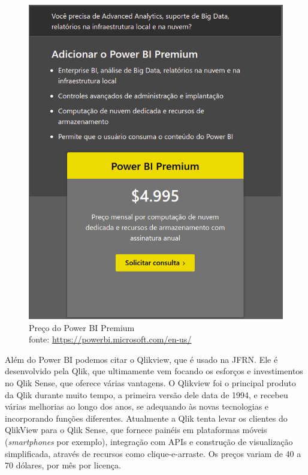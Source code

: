 \begin{figure}[h]
	\centering
	\includegraphics[scale=0.40]{./figures/cap1/powerbi.png}
	\caption{Preço do Power BI Premium \\ fonte: \url{https://powerbi.microsoft.com/en-us/}}
\end{figure}


Além do Power BI podemos citar o Qlikview, que é usado na JFRN. Ele é desenvolvido pela Qlik, que ultimamente vem focando os esforços e investimentos no Qlik Sense, que oferece várias vantagens. O Qlikview foi o principal produto da Qlik durante muito tempo, a primeira versão dele data de 1994, e recebeu várias melhorias ao longo dos anos, se adequando às novas tecnologias e incorporando funções diferentes. Atualmente a Qlik tenta levar os clientes do QlikView para o Qlik Sense, que fornece painéis em plataformas móveis (\textit{smartphones} por exemplo), integração com APIs e construção de visualização simplificada, através de recursos como clique-e-arraste. Os preços variam de 40 a 70 dólares, por mês por licença.


